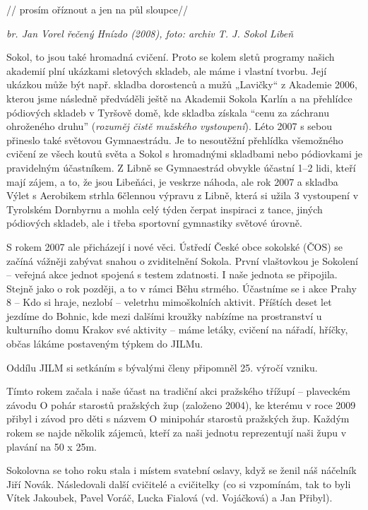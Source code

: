 // prosím oříznout a jen na půl sloupce//

\emph{br. Jan Vorel řečený Hnízdo (2008), foto: archiv T. J. Sokol
Libeň}

Sokol, to jsou také hromadná cvičení. Proto se kolem sletů programy
našich akademií plní ukázkami sletových skladeb, ale máme i vlastní
tvorbu. Její ukázkou může být např. skladba dorostenců a mužů „Lavičky``
z Akademie 2006, kterou jsme následně předváděli ještě na Akademii
Sokola Karlín a na přehlídce pódiových skladeb v Tyršově domě, kde
skladba získala ``cenu za záchranu ohroženého druhu'' (\emph{rozuměj
čistě mužského vystoupení}). Léto 2007 s sebou přineslo také světovou
Gymnaestrádu. Je to nesoutěžní přehlídka všemožného cvičení ze všech
koutů světa a Sokol s hromadnými skladbami nebo pódiovkami je
pravidelným účastníkem. Z Libně se Gymnaestrád obvykle účastní 1--2
lidi, kteří mají zájem, a to, že jsou Libeňáci, je veskrze náhoda, ale
rok 2007 a skladba Výlet s Aerobikem strhla 6člennou výpravu z Libně,
která si užila 3 vystoupení v Tyrolském Dornbyrnu a mohla celý týden
čerpat inspiraci z tance, jiných pódiových skladeb, ale i třeba
sportovní gymnastiky světové úrovně.

S rokem 2007 ale přicházejí i nové věci. Ústředí České obce sokolské
(ČOS) se začíná vážněji zabývat snahou o zviditelnění Sokola. První
vlaštovkou je Sokolení -- veřejná akce jednot spojená s testem
zdatnosti. I naše jednota se připojila. Stejně jako o rok později, a to
v rámci Běhu strmého. Účastníme se i akce Prahy 8 -- Kdo si hraje,
nezlobí -- veletrhu mimoškolních aktivit. Příštích deset let jezdíme do
Bohnic, kde mezi dalšími kroužky nabízíme na prostranství u kulturního
domu Krakov své aktivity -- máme letáky, cvičení na nářadí, hříčky,
občas lákáme postaveným týpkem do JILMu.

Oddílu JILM si setkáním s bývalými členy připomněl 25. výročí vzniku.

Tímto rokem začala i naše účast na tradiční akci pražského třížupí --
plaveckém závodu O pohár starostů pražských žup (založeno 2004), ke
kterému v roce 2009 přibyl i závod pro děti s názvem O minipohár
starostů pražských žup. Každým rokem se najde několik zájemců, kteří za
naši jednotu reprezentují naši župu v plavání na 50 x 25m.

Sokolovna se toho roku stala i místem svatební oslavy, když se ženil náš
náčelník Jiří Novák. Následovali další cvičitelé a cvičitelky (co si
vzpomínám, tak to byli Vítek Jakoubek, Pavel Voráč, Lucka Fialová (vd.
Vojáčková) a Jan Přibyl).

